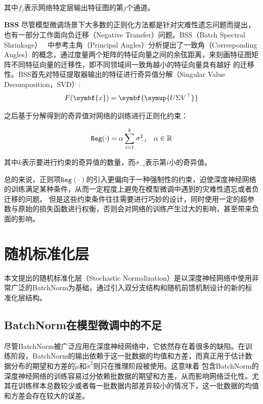 其中$f_j$表示网络特定层输出特征图的第$j$个通道。

\textbf{BSS } 尽管模型微调场景下大多数的正则化方法都是针对灾难性遗忘问题而提出，也有一部分工作面向负迁移（Negative Transfer）问题。BSS（Batch Spectral Shrinkage）~\citep{chen2019catastrophic}
中参考主角（Principal Angles）分析提出了一致角（Corresponding Angles）的概念，通过度量两个矩阵的特征向量之间的余弦距离，来刻画特征图矩阵不同特征向量的迁移性，即不同领域间一致角越小的特征向量具有越好
的迁移性。BSS首先对特征提取器输出的特征进行奇异值分解（Singular Value Decomposition，SVD）:
\begin{equation}
  F(\symbf{x}) = \symbf{\symup{U\Sigma V^\top}}
\end{equation}

之后基于分解得到的奇异值对网络的训练进行正则化约束：

\begin{equation}
  \texttt{Reg} (\cdot) = \alpha \sum_{i=1}^k \sigma_{-i}^2 \quad \alpha \in \mathbb{R} \\
\end{equation}

其中$k$表示要进行约束的奇异值的数量，而$\sigma_{-i}$表示第$i$小的奇异值。

总的来说，正则项$\texttt{Reg} (\cdot)$的引入更偏向于一种强制性的约束，迫使深度神经网络的训练满足某种条件，从而一定程度上避免在模型微调中遇到的灾难性遗忘或者负迁移的问题。
但是这些约束条件往往需要进行巧妙的设计，同时使用一定的超参数与原始的损失函数进行权衡，否则会对网络的训练产生过大的影响，甚至带来负面的影响。

\section{随机标准化层}

本文提出的随机标准化层（Stochastic Normalization）是以深度神经网络中使用非常广泛的BatchNorm为基础，通过引入双分支结构和随机前馈机制设计的新的标准化层结构。

\subsection{BatchNorm在模型微调中的不足}

尽管BatchNorm被广泛应用在深度神经网络中，它依然存在着很多的缺陷。在训练阶段，BatchNorm的输出依赖于这一批数据的均值和方差，而真正用于估计数据分布的期望和方差的$\tilde{\mu}$和$\tilde{\sigma}^2$则只在推理阶段被使用。这意味着
包含BatchNorm的深度神经网络的训练容易过分依赖批数据的期望和方差，从而影响网络泛化性。尤其在训练样本总数较少或者每一批数据内部差异较小的情况下，这一批数据的均值和方差会存在较大的误差。


